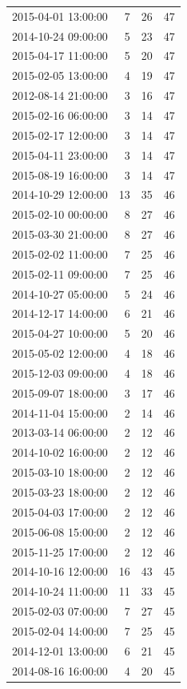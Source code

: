 \begin{tabular}{lrrr}
2015-04-01 13:00:00 & 7 & 26 & 47 \\
2014-10-24 09:00:00 & 5 & 23 & 47 \\
2015-04-17 11:00:00 & 5 & 20 & 47 \\
2015-02-05 13:00:00 & 4 & 19 & 47 \\
2012-08-14 21:00:00 & 3 & 16 & 47 \\
2015-02-16 06:00:00 & 3 & 14 & 47 \\
2015-02-17 12:00:00 & 3 & 14 & 47 \\
2015-04-11 23:00:00 & 3 & 14 & 47 \\
2015-08-19 16:00:00 & 3 & 14 & 47 \\
2014-10-29 12:00:00 & 13 & 35 & 46 \\
2015-02-10 00:00:00 & 8 & 27 & 46 \\
2015-03-30 21:00:00 & 8 & 27 & 46 \\
2015-02-02 11:00:00 & 7 & 25 & 46 \\
2015-02-11 09:00:00 & 7 & 25 & 46 \\
2014-10-27 05:00:00 & 5 & 24 & 46 \\
2014-12-17 14:00:00 & 6 & 21 & 46 \\
2015-04-27 10:00:00 & 5 & 20 & 46 \\
2015-05-02 12:00:00 & 4 & 18 & 46 \\
2015-12-03 09:00:00 & 4 & 18 & 46 \\
2015-09-07 18:00:00 & 3 & 17 & 46 \\
2014-11-04 15:00:00 & 2 & 14 & 46 \\
2013-03-14 06:00:00 & 2 & 12 & 46 \\
2014-10-02 16:00:00 & 2 & 12 & 46 \\
2015-03-10 18:00:00 & 2 & 12 & 46 \\
2015-03-23 18:00:00 & 2 & 12 & 46 \\
2015-04-03 17:00:00 & 2 & 12 & 46 \\
2015-06-08 15:00:00 & 2 & 12 & 46 \\
2015-11-25 17:00:00 & 2 & 12 & 46 \\
2014-10-16 12:00:00 & 16 & 43 & 45 \\
2014-10-24 11:00:00 & 11 & 33 & 45 \\
2015-02-03 07:00:00 & 7 & 27 & 45 \\
2015-02-04 14:00:00 & 7 & 25 & 45 \\
2014-12-01 13:00:00 & 6 & 21 & 45 \\
2014-08-16 16:00:00 & 4 & 20 & 45 \\

\end{tabular}
